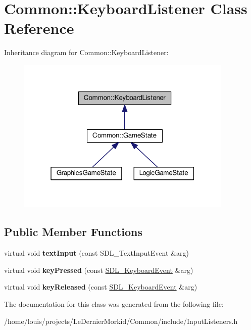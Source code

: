 \hypertarget{class_common_1_1_keyboard_listener}{}\section{Common\+:\+:Keyboard\+Listener Class Reference}
\label{class_common_1_1_keyboard_listener}


Inheritance diagram for Common\+:\+:Keyboard\+Listener\+:\nopagebreak
\begin{figure}[H]
\begin{center}
\leavevmode
\includegraphics[width=292pt]{class_common_1_1_keyboard_listener__inherit__graph}
\end{center}
\end{figure}
\subsection*{Public Member Functions}
\begin{DoxyCompactItemize}
\item 
\mbox{\label{class_common_1_1_keyboard_listener_ac59d0721df35da0d3346b102845a92b2}} 
virtual void {\bfseries text\+Input} (const S\+D\+L\+\_\+\+Text\+Input\+Event \&arg)
\item 
\mbox{\label{class_common_1_1_keyboard_listener_a1c6fd0d269a2590fcc7c2fa5aca78f5d}} 
virtual void {\bfseries key\+Pressed} (const \hyperlink{struct_s_d_l___keyboard_event}{S\+D\+L\+\_\+\+Keyboard\+Event} \&arg)
\item 
\mbox{\label{class_common_1_1_keyboard_listener_a99446142b6d4d6bb230b503afc021e12}} 
virtual void {\bfseries key\+Released} (const \hyperlink{struct_s_d_l___keyboard_event}{S\+D\+L\+\_\+\+Keyboard\+Event} \&arg)
\end{DoxyCompactItemize}


The documentation for this class was generated from the following file\+:\begin{DoxyCompactItemize}
\item 
/home/louis/projects/\+Le\+Dernier\+Morkid/\+Common/include/Input\+Listeners.\+h\end{DoxyCompactItemize}
